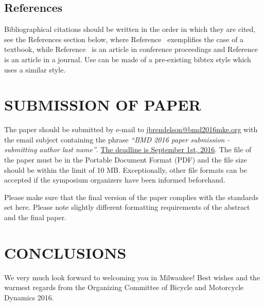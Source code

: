 \documentclass{bmd2016p}
\begin{document}
\subsection{References}

Bibliographical citations should be written in the order in which they are 
cited, see the References section below, where Reference~\cite{Pac02} 
exemplifies the case of a textbook, while Reference~\cite{Ber07} is an article 
in conference proceedings and Reference~\cite{Sha71} is an article in a 
journal. Use can be made of a pre-existing bibtex style which uses a similar 
style.


\section{SUBMISSION OF PAPER}

The paper should be submitted by e-mail to \href{mailto:jbrendelson@bmd2016mke.org}{jbrendelson@bmd2016mke.org} with the email subject containing the phrase \textit{``BMD 2016 paper submission - submitting author last name''}. \uline{The deadline is September 1st, 2016}. The file of the paper must be in the Portable Document Format (PDF) and the file size should be within the limit of 10 MB. Exceptionally, other file formats can be accepted if the symposium organizers have been informed beforehand. 

Please make sure that the final version of the paper complies with the standards set here. Please note slightly different formatting requirements of the abstract and the final paper.

\section{CONCLUSIONS}

We very much look forward to welcoming you in Milwaukee! Best wishes and the 
warmest regards from the Organizing Committee of Bicycle and Motorcycle 
Dynamics 2016.



\end{document}
